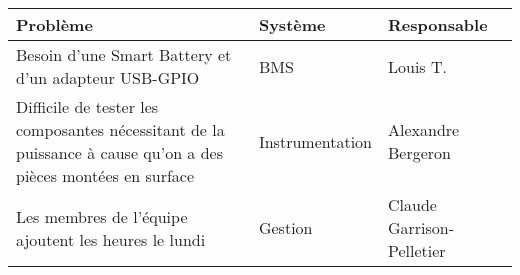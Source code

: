 \begin{tabularx}{\linewidth}{
    |>{\hsize=2.0\hsize}X|%
    >{\hsize=0.5\hsize}X|%
    >{\hsize=0.5\hsize}X|%
  }
    \hline
    \textbf{Problème} & \textbf{Système} & \textbf{Responsable} \\\hline
    Besoin d'une Smart Battery et d'un adapteur USB-GPIO & BMS & Louis T. \\\hline
    Difficile de tester les composantes nécessitant de la puissance à cause qu'on a des pièces montées en surface & Instrumentation & Alexandre Bergeron  \\\hline
    Les membres de l'équipe ajoutent les heures le lundi & Gestion & Claude Garrison-Pelletier  \\\hline
  \end{tabularx}
    
    
